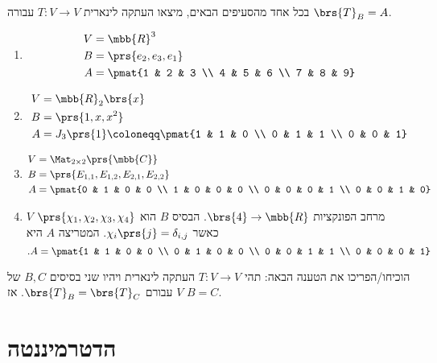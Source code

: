 \documentclass[a4paper,10pt,twoside,openany]{article}
\begin{document}
\begin{exercise}
בכל אחד מהסעיפים הבאים, מיצאו העתקה לינארית
$T \colon V \to V$
עבורה
$\brs{T}_B = A$.
\begin{enumerate}
\item
\begin{align*}
V &= \mbb{R}^3 \\
B &= \prs{e_2, e_3, e_1} \\
A &= \pmat{1 & 2 & 3 \\ 4 & 5 & 6 \\ 7 & 8 & 9}
\end{align*}
\item
\begin{align*}
V &= \mbb{R}_2\brs{x} \\
B &= \prs{1, x, x^2} \\
A &= J_3\prs{1} \coloneqq \pmat{1 & 1 & 0 \\ 0 & 1 & 1 \\ 0 & 0 & 1}
\end{align*}
\item
\begin{align*}
V &= \Mat_{2 \times 2}\prs{\mbb{C}} \\
B &= \prs{E_{1,1}, E_{1,2}, E_{2,1}, E_{2,2}} \\
A &= \pmat{0 & 1 & 0 & 0 \\ 1 & 0 & 0 & 0 \\ 0 & 0 & 0 & 1 \\ 0 & 0 & 1 & 0}
\end{align*}

\item
$V$
מרחב הפונקציות
$\brs{4} \to \mbb{R}$.
הבסיס
$B$
הוא
$\prs{\chi_1, \chi_2, \chi_3, \chi_4}$
כאשר
$\chi_i\prs{j} = \delta_{i,j}$.
המטריצה
$A$
היא
\[\text{.} A = \pmat{1 & 1 & 0 & 0 \\ 0 & 1 & 0 & 0 \\ 0 & 0 & 1 & 1 \\ 0 & 0 & 0 & 1}\]
\end{enumerate}
\end{exercise}

\begin{exercise}
הוכיחו/הפריכו את הטענה הבאה:
תהי
$T \colon V \to V$
העתקה לינארית ויהיו שני בסיסים
$B,C$
של
$V$
עבורם
$\brs{T}_B = \brs{T}_C$.
אז
$B = C$.
\end{exercise}

\section{הדטרמיננטה}
\end{document}
